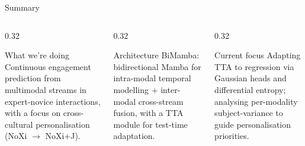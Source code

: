 \documentclass[aspectratio=169]{beamer}
\begin{document}
	\begin{frame}{Summary}
		\begin{columns}
			\begin{column}{0.32\textwidth}
				\begin{block}{What we're doing}
					\small
					Continuous engagement prediction from multimodal streams in expert-novice interactions, with a focus on cross-cultural personalisation (NoXi $\to$ NoXi+J).
				\end{block}
			\end{column}
			\begin{column}{0.32\textwidth}
				\begin{block}{Architecture}
					\small
					BiMamba: bidirectional Mamba for intra-modal temporal modelling + inter-modal cross-stream fusion, with a TTA module for test-time adaptation.
				\end{block}
			\end{column}
			\begin{column}{0.32\textwidth}
				\begin{block}{Current focus}
					\small
					Adapting TTA to regression via Gaussian heads and differential entropy; analysing per-modality subject-variance to guide personalisation priorities.
				\end{block}
			\end{column}
		\end{columns}
		\vspace{1em}
		\begin{center}
		\end{center}
	\end{frame}
	
\end{document}
